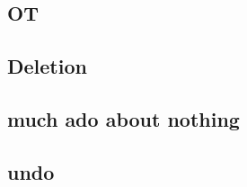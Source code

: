 \documentclass[english,submission]{programming}
\theoremstyle{definition}
\begin{document}
\subsection{OT}

\subsection{Deletion}




\subsection{much ado about nothing}



\subsection{undo}

\end{document}
